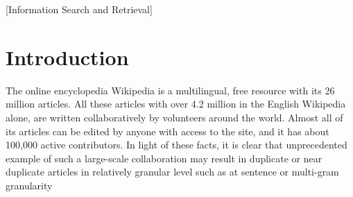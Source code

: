 \documentclass{acm_proc_article-sp}
\begin{document}
\date{19 April 2013}


\maketitle
\begin{abstract}
The growth of Internet has enabled collaboration and cooperation on a large scale, resulting in an abundant number of near-duplicate web documents. The range of occurrences is even more evident within Wikipedia articles, due to its editing largely being open. Except for particularly sensitive and/or vandalism-prone pages that are "protected" to some degree from editing, the reader of an article can edit the text by copying from another article without needing approval. Although we are not inspired to measure the quality of Wikipedia articles, we are interested in finding near-duplicate occurrences at various granularity levels. 

In this paper, we describe a novel similarity detection algorithm that utilizes locality sensitive hashing (LSH) technique on MapReduce framework. The algorithm has been designed and implemented to detect similar articles using large Wikipedia dumps, in compressed or uncompressed forms. Experimental results appear to support that our method is able to efficiently and effectively detect similar articles from large Wikipedia dumps.
\end{abstract}

[Information Search and Retrieval]


\section{Introduction}
The online encyclopedia Wikipedia is a multilingual, free resource with its 26 million articles. All these articles with over 4.2 million in the English Wikipedia alone, are written collaboratively by volunteers around the world. Almost all of its articles can be edited by anyone with access to the site, and it has about 100,000 active contributors. In light of these facts, it is clear that unprecedented example of such a large-scale collaboration may result in duplicate or near duplicate articles in relatively granular level such as at sentence or multi-gram granularity \cite{wiki:weblink}
\end{document}
